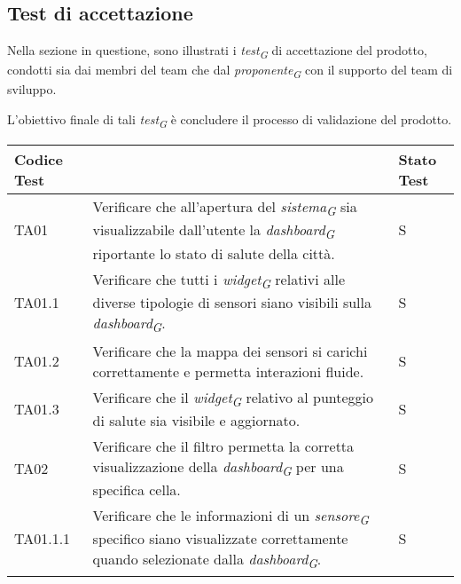 \subsection{Test di accettazione}
Nella sezione in questione, sono illustrati i \textit{test}\textsubscript{\textit{G}} di accettazione del prodotto, condotti sia dai membri del team che dal \textit{proponente}\textsubscript{\textit{G}} con il supporto del team di sviluppo.

L'obiettivo finale di tali \textit{test}\textsubscript{\textit{G}} è concludere il processo di validazione del prodotto.

\vspace{0.4cm}

\begin{longtable}{|C{1.9cm}|L{5cm}|C{2cm}|}
    \hline
    \textbf{Codice Test} &  & \textbf{Stato Test} \\
    \hline \hline
    
    TA01 & Verificare che all'apertura del \textit{sistema}\textsubscript{\textit{G}} sia visualizzabile dall'utente la \textit{dashboard}\textsubscript{\textit{G}} riportante lo stato di salute della città. & S \\
    \hline
    
    TA01.1 & Verificare che tutti i \textit{widget}\textsubscript{\textit{G}} relativi alle diverse tipologie di sensori siano visibili sulla \textit{dashboard}\textsubscript{\textit{G}}. & S \\
    \hline
    
    TA01.2 & Verificare che la mappa dei sensori si carichi correttamente e permetta interazioni fluide. & S \\
    \hline
    
    TA01.3 & Verificare che il \textit{widget}\textsubscript{\textit{G}} relativo al punteggio di salute sia visibile e aggiornato. & S \\
    \hline
    
    TA02 & Verificare che il filtro permetta la corretta visualizzazione della \textit{dashboard}\textsubscript{\textit{G}} per una specifica cella. & S \\
    \hline
    
    TA01.1.1 & Verificare che le informazioni di un \textit{sensore}\textsubscript{\textit{G}} specifico siano visualizzate correttamente quando selezionate dalla \textit{dashboard}\textsubscript{\textit{G}}. & S \\
    \hline
    

\end{longtable}
